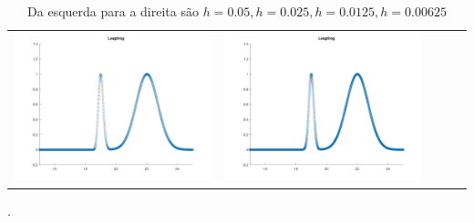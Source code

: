 \documentclass{article}
\begin{document}
\begin{table}[h]
\begin{tabular}{ccccc}
            \includegraphics[scale = 0.17]{Leapfrog4.png} & \includegraphics[scale = 0.17]{Leapfrog8.png}
        \end{tabular}
    \label{tbl:table_of_figures}
    \caption{Da esquerda para a direita são $h = 0.05, h = 0.025,h = 0.0125, h = 0.00625$}.
\end{table}

\newpage
\end{document}
